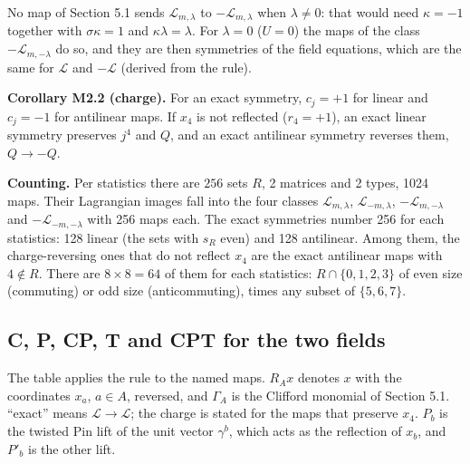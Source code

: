 \documentclass[11pt]{article}
\begin{document}
No map of Section 5.1 sends $\mathcal L_{m,\lambda}$ to $-\mathcal L_{m,\lambda}$ when $\lambda\ne0$: that would need $\kappa=-1$ together with $\sigma\kappa=1$ and $\kappa\lambda=\lambda$. For $\lambda=0$ ($U=0$) the maps of the class $-\mathcal L_{m,-\lambda}$ do so, and they are then symmetries of the field equations, which are the same for $\mathcal L$ and $-\mathcal L$ (derived from the rule).

\textbf{Corollary M2.2 (charge).} For an exact symmetry, $c_j=+1$ for linear and $c_j=-1$ for antilinear maps. If $x_4$ is not reflected ($r_4=+1$), an exact linear symmetry preserves $j^4$ and $Q$, and an exact antilinear symmetry reverses them, $Q\to-Q$.

\textbf{Counting.} Per statistics there are $256$ sets $R$, 2 matrices and 2 types, 1024 maps. Their Lagrangian images fall into the four classes $\mathcal L_{m,\lambda}$, $\mathcal L_{-m,\lambda}$, $-\mathcal L_{m,-\lambda}$ and $-\mathcal L_{-m,-\lambda}$ with 256 maps each. The exact symmetries number 256 for each statistics: 128 linear (the sets with $s_R$ even) and 128 antilinear. Among them, the charge-reversing ones that do not reflect $x_4$ are the exact antilinear maps with $4\notin R$. There are $8\times8=64$ of them for each statistics: $R\cap\{0,1,2,3\}$ of even size (commuting) or odd size (anticommuting), times any subset of $\{5,6,7\}$.

\subsection{C, P, CP, T and CPT for the two fields}

The table applies the rule to the named maps. $R_Ax$ denotes $x$ with the coordinates $x_a$, $a\in A$, reversed, and $\Gamma_A$ is the Clifford monomial of Section 5.1. ``exact'' means $\mathcal L\to\mathcal L$; the charge is stated for the maps that preserve $x_4$. $P_b$ is the twisted Pin lift of the unit vector $\gamma^b$, which acts as the reflection of $x_b$, and $P'_b$ is the other lift.
\end{document}
